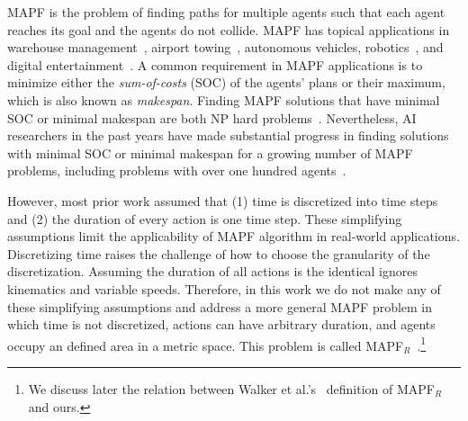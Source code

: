 \documentclass[review]{elsarticle}
\newcommand\konstantin[1]{\nb{\textbf{Konstantin:}}{red}{#1}}
\newcommand\roni[1]{\nb{\textbf{Roni:}}{green}{#1}}
\newcommand{\mapfr}{\ac{MAPF}$_R$\xspace}
\newcommand{\mapf}{\ac{MAPF}\xspace}
\begin{document}

\mapf is the problem of finding paths for multiple agents such that each agent reaches its goal and the agents do not collide. \mapf has topical applications in warehouse management~\cite{wurman2008coordinating}, airport towing~\cite{morris2016planning}, autonomous vehicles, robotics~\cite{veloso2015cobots}, and digital entertainment~\cite{ma2017feasibility}.
A common requirement in \mapf applications is to minimize either the \emph{sum-of-costs} (SOC) of the agents' plans 
or their maximum, which is also known as \emph{makespan}. %
Finding \mapf solutions that have minimal SOC or minimal makespan are both NP hard problems~\cite{surynek2010optimization,yu2013structure}.  
Nevertheless, AI researchers in the past years have made substantial progress in finding solutions with minimal SOC or minimal makespan for a growing number of \mapf problems, including problems with over one hundred agents~\cite{sharon2015conflict,sharon2013increasing,wagner2015subdimensional,standley2010finding,felner2018adding,ICTAIpicat,yu2013structure}. 




However, most prior work assumed that 
(1) time is discretized into time steps and
(2) the duration of every action is one time step. 
These simplifying assumptions limit the applicability of \mapf algorithm in real-world applications. Discretizing time raises the challenge of how to choose the granularity of the discretization. Assuming the duration of all actions is the identical ignores kinematics and variable speeds. 
Therefore, in this work we do not make any of these simplifying assumptions and address a more general \mapf problem in which time is not discretized, actions can have arbitrary duration, and agents occupy an defined area in a metric space. This problem is called \mapfr~\cite{walker2018extended}.\footnote{We discuss later the relation between Walker et al.'s~\cite{walker2018extended} definition of \mapfr and ours.}
\end{document}
